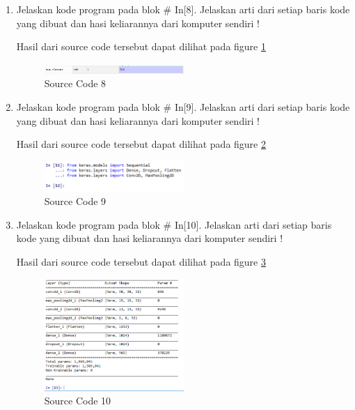 \begin{enumerate}
\item Jelaskan kode program pada blok \# In[8]. Jelaskan arti dari setiap baris kode yang dibuat dan hasi keliarannya dari komputer sendiri !
	
	\subitem Hasil dari source code tersebut dapat dilihat pada figure \ref{YNC7-16}
	\begin{figure}[!htbp!]
		\centerline{\includegraphics[width=0.5\textwidth]{figures/YN/Chapter7/YNC7-16.png}}
		\caption{Source Code 8}
		\label{YNC7-16}
	\end{figure}	

\item Jelaskan kode program pada blok \# In[9]. Jelaskan arti dari setiap baris kode yang dibuat dan hasi keliarannya dari komputer sendiri !
	
	\subitem Hasil dari source code tersebut dapat dilihat pada figure \ref{YNC7-17}
	\begin{figure}[!htbp!]
		\centerline{\includegraphics[width=0.5\textwidth]{figures/YN/Chapter7/YNC7-17.png}}
		\caption{Source Code 9}
		\label{YNC7-17}
	\end{figure}	

\item Jelaskan kode program pada blok \# In[10]. Jelaskan arti dari setiap baris kode yang dibuat dan hasi keliarannya dari komputer sendiri !
	
	\subitem Hasil dari source code tersebut dapat dilihat pada figure \ref{YNC7-18}
	\begin{figure}[!htbp!]
		\centerline{\includegraphics[width=0.5\textwidth]{figures/YN/Chapter7/YNC7-18.png}}
		\caption{Source Code 10}
		\label{YNC7-18}
	\end{figure}


\end{enumerate}
